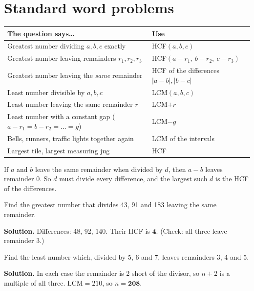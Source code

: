 \documentclass[11pt,a4paper,openany]{report}
\begin{document}
\section{Standard word problems}
\begin{center}\small
\begin{tabular}{>{\raggedright}p{6.6cm}>{\raggedright\arraybackslash}p{7.8cm}}
\toprule
The question says\dots & Use\\\midrule
Greatest number dividing $a,b,c$ exactly & HCF$(a,b,c)$\\
Greatest number leaving remainders $r_1,r_2,r_3$ & HCF$(a-r_1,\ b-r_2,\ c-r_3)$\\
Greatest number leaving the \emph{same} remainder & HCF of the differences $|a-b|,|b-c|$\\
Least number divisible by $a,b,c$ & LCM$(a,b,c)$\\
Least number leaving the same remainder $r$ & LCM$+r$\\
Least number with a constant gap ($a-r_1=b-r_2=\dots=g$) & LCM$-g$\\
Bells, runners, traffic lights together again & LCM of the intervals\\
Largest tile, largest measuring jug & HCF\\
\bottomrule
\end{tabular}
\end{center}

\begin{why}
If $a$ and $b$ leave the same remainder when divided by $d$, then $a-b$ leaves remainder 0. So $d$ must divide every difference, and the largest such $d$ is the HCF of the differences.
\end{why}

\begin{example}
Find the greatest number that divides 43, 91 and 183 leaving the same remainder.

\textbf{Solution.} Differences: 48, 92, 140. Their HCF is $\mathbf{4}$. (Check: all three leave remainder 3.)
\end{example}

\begin{example}
Find the least number which, divided by 5, 6 and 7, leaves remainders 3, 4 and 5.

\textbf{Solution.} In each case the remainder is 2 short of the divisor, so $n+2$ is a multiple of all three. $\text{LCM}=210$, so $n=\mathbf{208}$.
\end{example}
\end{document}
